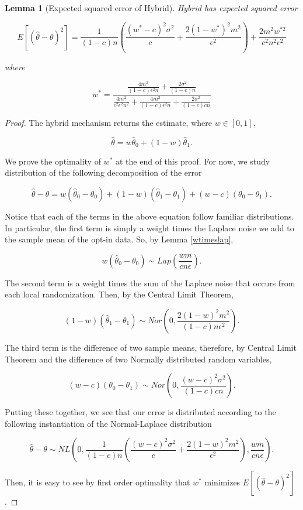 \documentclass[sigconf]{acmart}
\theoremstyle{plain}
\newtheorem{lem}[thm]{Lemma}
\begin{document}
\begin{lem}[Expected squared error of Hybrid]
Hybrid has expected squared error 

$$E[(\hat{\theta} - \theta)^2] = \frac{1}{(1-c)n}\left(\frac{(w^*-c)^2\sigma^2}{c} + \frac{2(1-w^*)^2 m^2}{\epsilon^2}\right) + \frac{2m^2w^{*2}}{c^2n^2\epsilon^2}$$

where

$$w^* = \frac{\frac{4 m^2}{(1-c) \epsilon^2 n}+\frac{2 \sigma^2}{(1-c) n}}{\frac{4 m^2}{c^2 \epsilon^2 n^2}+\frac{4 m^2}{(1-c) \epsilon^2 n}+\frac{2 \sigma^2}{(1-c) c n}}$$
\end{lem}

\begin{proof}
The hybrid mechanism returns the estimate, where $w \in [0,1]$,

$$\hat{\theta} = w\hat{\theta}_0 + (1-w)\hat{\theta}_1.$$

We prove the optimality of $w^*$ at the end of this proof. For now, we study distribution of the following decomposition of the error

$$\hat{\theta} - \theta = w(\hat{\theta}_0 - \theta_0) + (1-w)(\hat{\theta}_1 - \theta_1) + (w-c)(\theta_0 - \theta_1).$$

Notice that each of the terms in the above equation follow familiar distributions. In particular, the first term is simply a weight times the Laplace noise we add to the sample mean of the opt-in data. So, by Lemma \ref{wtimeslap},

$$w(\hat{\theta}_0 - \theta_0) \sim Lap\left(\frac{wm}{cn\epsilon}\right).$$

The second term is a weight times the sum of the Laplace noise that occurs from each local randomization. Then, by the Central Limit Theorem,

$$(1-w)(\hat{\theta}_1 - \theta_1) \sim Nor\left(0, \frac{2(1-w)^2 m^2}{(1-c)n\epsilon^2}\right).$$

The third term is the difference of two sample means, therefore, by Central Limit Theorem and the difference of two Normally distributed random variables, 

$$(w-c)(\theta_0 - \theta_1) \sim Nor\left(0, \frac{(w-c)^2\sigma^2}{(1-c)cn}\right).$$

Putting these together, we see that our error is distributed according to the following instantiation of the Normal-Laplace distribution

$$\hat{\theta} - \theta \sim NL\left(0, \frac{1}{(1-c)n}\left(\frac{(w-c)^2\sigma^2}{c} + \frac{2(1-w)^2 m^2}{\epsilon^2}\right), \frac{wm}{cn\epsilon}\right).$$

Then, it is easy to see by first order optimality that $w^*$ minimizes $E[(\hat{\theta} - \theta)^2]$.
\end{proof}
\end{document}
